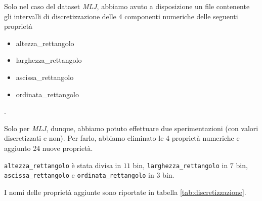 Solo nel caso del dataset \emph{MLJ}, abbiamo avuto a disposizione un file contenente gli intervalli di discretizzazione delle 4 componenti numeriche delle seguenti proprietà
\begin{itemize}
\item altezza\_rettangolo
\item larghezza\_rettangolo
\item ascissa\_rettangolo
\item ordinata\_rettangolo
\end{itemize}
.

Solo per \emph{MLJ}, dunque, abbiamo potuto effettuare due sperimentazioni (con valori discretizzati e non). Per farlo, abbiamo eliminato le 4 proprietà numeriche e aggiunto 24 nuove proprietà.

\verb+altezza_rettangolo+ è stata divisa in $11$ bin, \verb+larghezza_rettangolo+ in $7$ bin, \verb+ascissa_rettangolo+ e \verb+ordinata_rettangolo+ in $3$ bin.

I nomi delle proprietà aggiunte sono riportate in tabella \ref{tab:discretizzazione}.


